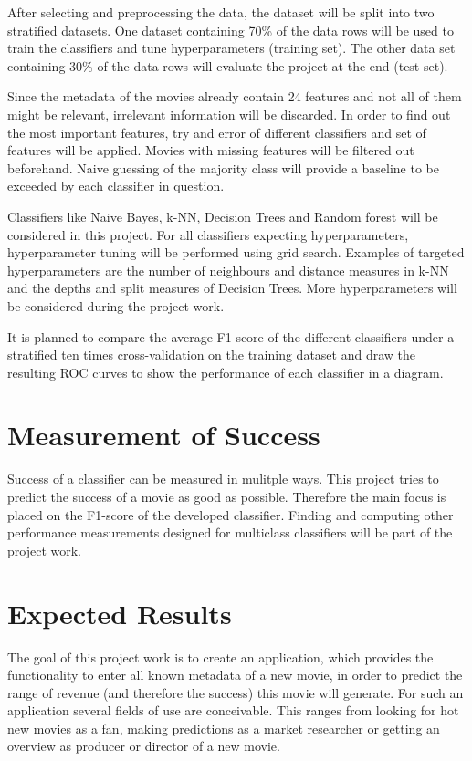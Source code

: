 After selecting and preprocessing the data, the dataset will be split into two stratified datasets. One dataset containing 70\% of the data rows will be used to train the classifiers and tune hyperparameters (training set). The other data set containing 30\% of the data rows will evaluate the project at the end (test set). 

Since the metadata of the movies already contain 24 features and not all of them might be relevant, irrelevant information will be discarded. In order to find out the most important features, try and error of different classifiers and set of features will be applied. Movies with missing features will be filtered out beforehand. Naive guessing of the majority class will provide a baseline to be exceeded by each classifier in question.

Classifiers like Naive Bayes, k-NN, Decision Trees and Random forest will be considered in this project. For all classifiers expecting hyperparameters, hyperparameter tuning will be performed using grid search. Examples of targeted hyperparameters are the number of neighbours and distance measures in k-NN and the depths and split measures of Decision Trees. More hyperparameters will be considered during the project work.

It is planned to compare the average F1-score of the different classifiers under a stratified ten times cross-validation on the training dataset and draw the resulting ROC curves to show the performance of each classifier in a diagram.


\section{Measurement of Success}
Success of a classifier can be measured in mulitple ways. This project tries to predict the success of a movie as good as possible. Therefore the main focus is placed on the F1-score of the developed classifier. Finding and computing other performance measurements designed for multiclass classifiers will be part of the project work.

\section{Expected Results}
The goal of this project work is to create an application, which provides the functionality to enter all known metadata of a new movie, in order to predict the range of revenue (and therefore the success) this movie will generate. For such an application several fields of use are conceivable. This ranges from looking for hot new movies as a fan, making predictions as a market researcher or getting an overview as producer or director of a new movie.





